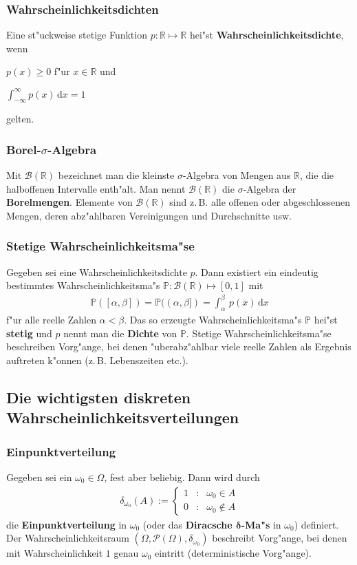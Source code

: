 \documentclass[ngerman,draft,parskip=half,twoside]{scrartcl}
\newcommand*{\R}{\mathbb{R}}      %
\newcommand*{\BorelM}{\mathcal{B}}  %
\newcommand*{\PotM}{\mathcal{P}}    %
\newcommand*{\WKM}{\mathbb{P}}      %
\begin{document}
\subsubsection{Wahrscheinlichkeitsdichten}
Eine st"uckweise stetige Funktion $p\colon\R\mapsto\R$ hei"st
\textbf{Wahrscheinlichkeitsdichte}, wenn
\begin{eigenschaften}
 \item $p(x)\ge 0$ f"ur $x\in\R$ und
 \item $\int_{-\infty}^\infty p(x)\,\mathrm d x=1$
\end{eigenschaften}
gelten.
\subsubsection{Borel-$\sigma$-Algebra}
Mit $\BorelM(\R)$ bezeichnet man die kleinste $\sigma$-Algebra von Mengen aus $\R$, die
die halboffenen Intervalle enth"alt. Man nennt $\BorelM(\R)$ die $\sigma$-Algebra der
\textbf{Borelmengen}. Elemente von $\BorelM(\R)$ sind z.\,B. alle offenen oder abgeschlossenen Mengen,
deren abz"ahlbaren Vereinigungen und Durchschnitte usw.
\subsubsection{Stetige Wahrscheinlichkeitsma"se}
Gegeben sei eine Wahrscheinlichkeitsdichte $p$. Dann existiert ein eindeutig bestimmtes
Wahrscheinlichkeitsma"s $\WKM \colon\BorelM(\R)\mapsto [0,1]$ mit
\begin{gather*}
  \WKM([\alpha,\beta])=\WKM((\alpha,\beta])=\int_\alpha^\beta\,p(x)\,\mathrm dx
\end{gather*}
f"ur alle reelle Zahlen $\alpha<\beta$. Das so erzeugte Wahrscheinlichkeitsma"s $\WKM$ hei"st \textbf{stetig}
und $p$ nennt man die \textbf{Dichte} von $\WKM$. Stetige Wahrscheinlichkeitsma"se beschreiben Vorg"ange,
bei denen "uberabz"ahlbar viele reelle Zahlen als Ergebnis auftreten k"onnen (z.\,B. Lebenszeiten etc.).
\subsection{Die wichtigsten diskreten Wahrscheinlichkeitsverteilungen}

\subsubsection{Einpunktverteilung}
Gegeben sei ein $\omega_0\in \Omega$, fest aber beliebig. Dann wird
durch
\begin{gather*}
  \delta_{\omega_0}(A):=\left\{
     \begin{array}{rcl}
       1 &\colon& \omega_0\in A\\
       0 &\colon& \omega_0\notin A
     \end{array}
     \right.
\end{gather*}
die \textbf{Einpunktverteilung} in $\omega_0$ (oder das \textbf{Diracsche $\mathbf \delta$-Ma"s} in
$\omega_0$) definiert. Der Wahrscheinlichkeitsraum $(\Omega,\PotM(\Omega),\delta_{\omega_0})$
beschreibt Vorg"ange, bei denen mit Wahrscheinlichkeit $1$ genau $\omega_0$ eintritt (deterministische
Vorg"ange).
\end{document}

